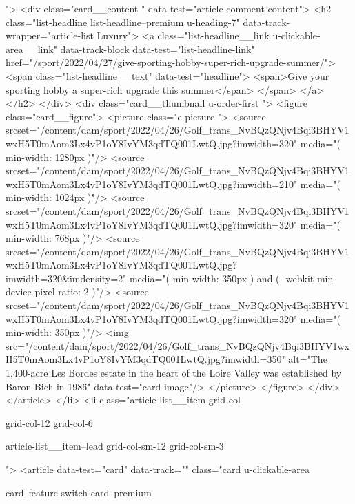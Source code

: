 {{{			 ">
<div class="card__content " data-test="article-comment-content">
<h2 class="list-headline list-headline--premium u-heading-7" data-track-wrapper="article-list Luxury">
<a class="list-headline__link u-clickable-area__link" data-track-block data-test="list-headline-link" href="/sport/2022/04/27/give-sporting-hobby-super-rich-upgrade-summer/">
<span class="list-headline__text" data-test="headline">
<span>Give your sporting hobby a super-rich upgrade this summer</span>
</span>
</a>
</h2>
</div>
<div class="card__thumbnail u-order-first ">
<figure class="card__figure">
<picture class="e-picture   ">
<source srcset="/content/dam/sport/2022/04/26/Golf_trans_NvBQzQNjv4Bqi3BHYV1wxH5T0mAom3Lx4vP1oY8IvYM3qdTQ001LwtQ.jpg?imwidth=320" media="( min-width: 1280px )"/>
<source srcset="/content/dam/sport/2022/04/26/Golf_trans_NvBQzQNjv4Bqi3BHYV1wxH5T0mAom3Lx4vP1oY8IvYM3qdTQ001LwtQ.jpg?imwidth=210" media="( min-width: 1024px )"/>
<source srcset="/content/dam/sport/2022/04/26/Golf_trans_NvBQzQNjv4Bqi3BHYV1wxH5T0mAom3Lx4vP1oY8IvYM3qdTQ001LwtQ.jpg?imwidth=320" media="( min-width: 768px )"/>
<source srcset="/content/dam/sport/2022/04/26/Golf_trans_NvBQzQNjv4Bqi3BHYV1wxH5T0mAom3Lx4vP1oY8IvYM3qdTQ001LwtQ.jpg?imwidth=320&imdensity=2" media="( min-width: 350px ) and ( -webkit-min-device-pixel-ratio: 2 )"/>
<source srcset="/content/dam/sport/2022/04/26/Golf_trans_NvBQzQNjv4Bqi3BHYV1wxH5T0mAom3Lx4vP1oY8IvYM3qdTQ001LwtQ.jpg?imwidth=320" media="( min-width: 350px )"/>
<img src="/content/dam/sport/2022/04/26/Golf_trans_NvBQzQNjv4Bqi3BHYV1wxH5T0mAom3Lx4vP1oY8IvYM3qdTQ001LwtQ.jpg?imwidth=350" alt="The 1,400-acre Les Bordes estate in the heart of the Loire Valley was established by Baron Bich in 1986" data-test="card-image"/>
</picture>
</figure>
</div>
</article>
</li>
<li class="article-list__item
				grid-col
				
				
				
				grid-col-12
				grid-col-6
				
				
				
				
				article-list__item--lead grid-col-sm-12
				grid-col-sm-3
				
				
				">
<article data-test="card" data-track="" class="card
			u-clickable-area
			
			card--feature-switch
			card--premium
			
			
			
			
			
}}}
